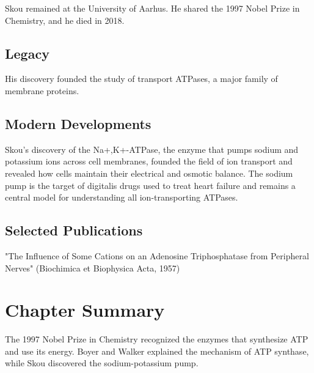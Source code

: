 Skou remained at the University of Aarhus. He shared the 1997 Nobel Prize in Chemistry, and he died in 2018.

\subsection*{Legacy}

His discovery founded the study of transport ATPases, a major family of membrane proteins.

\subsection*{Modern Developments}

Skou's discovery of the Na+,K+-ATPase, the enzyme that pumps sodium and potassium ions across cell membranes, founded the field of ion transport and revealed how cells maintain their electrical and osmotic balance. The sodium pump is the target of digitalis drugs used to treat heart failure and remains a central model for understanding all ion-transporting ATPases.

\subsection*{Selected Publications}

"The Influence of Some Cations on an Adenosine Triphosphatase from Peripheral Nerves" (Biochimica et Biophysica Acta, 1957)

\clearpage

\section*{Chapter Summary}

The 1997 Nobel Prize in Chemistry recognized the enzymes that synthesize ATP and use its energy. Boyer and Walker explained the mechanism of ATP synthase, while Skou discovered the sodium-potassium pump.

